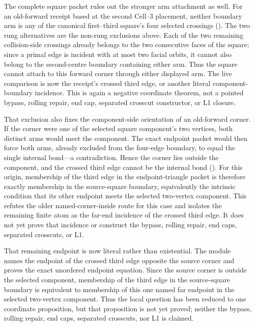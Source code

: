 \documentclass[11pt]{article}
\theoremstyle{definition}
\begin{document}
The complete square packet rules out the stronger arm attachment as well.
For an old-forward receipt based at the second Cell--3 placement, neither
boundary arm is any of the canonical first--third square's four selected
crossings
().
The two rung alternatives are the non-rung exclusions above.  Each of the two
remaining collision-side crossings already belongs to the two consecutive
faces of the square; since a primal edge is incident with at most two facial
orbits, it cannot also belong to the second-centre boundary containing either
arm.  Thus the square cannot attach to this forward corner through either
displayed arm.  The live comparison is now the receipt's crossed third edge,
or another literal component-boundary incidence.  This is again a negative
coordinate theorem, not a pointed bypass, rolling repair, end cap, separated
crosscut constructor, or L1 closure.

That exclusion also fixes the component-side orientation of an old-forward
corner.  If the corner were one of the selected square component's two
vertices, both distinct arms would meet the component.  The exact endpoint
packet would then force both arms, already excluded from the four-edge
boundary, to equal the single internal bond---a contradiction.  Hence the
corner lies outside the component, and the crossed third edge cannot be the
internal bond
().
For this origin, membership of the third edge in the endpoint-triangle packet
is therefore exactly membership in the source-square boundary, equivalently
the intrinsic condition that its other endpoint meets the selected two-vertex
component.  This refutes the older named-corner-inside route for this case and
isolates the remaining finite atom as the far-end incidence of the crossed
third edge.  It does not yet prove that incidence or construct the bypass,
rolling repair, end caps, separated crosscuts, or L1.

That remaining endpoint is now literal rather than existential.  The module
names the endpoint of the crossed third edge opposite the source corner and
proves the exact unordered endpoint equation.  Since the source corner is
outside the selected component, membership of the third edge in the
source-square boundary is equivalent to membership of this one named far
endpoint in the selected two-vertex component.  Thus the local question has
been reduced to one coordinate proposition, but that proposition is not yet
proved; neither the bypass, rolling repair, end caps, separated crosscuts, nor
L1 is claimed.
\end{document}
